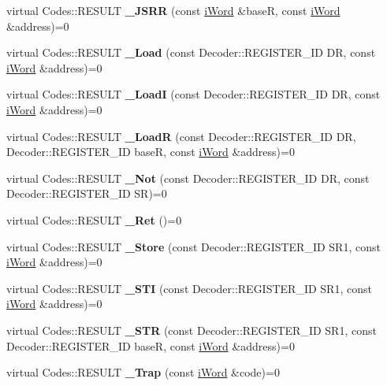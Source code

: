 \begin{DoxyCompactItemize}
\item 
\hypertarget{classiWi11_aeabd561f2728e2345b6a5ae5cdd5b84a}{
virtual Codes::RESULT {\bfseries \_\-JSRR} (const \hyperlink{classiWord}{iWord} \&baseR, const \hyperlink{classiWord}{iWord} \&address)=0}
\label{classiWi11_aeabd561f2728e2345b6a5ae5cdd5b84a}

\item 
\hypertarget{classiWi11_aed1f870b129617436434bb6dcee521ce}{
virtual Codes::RESULT {\bfseries \_\-Load} (const Decoder::REGISTER\_\-ID DR, const \hyperlink{classiWord}{iWord} \&address)=0}
\label{classiWi11_aed1f870b129617436434bb6dcee521ce}

\item 
\hypertarget{classiWi11_ab8f6fc32bfc363f9798c795320c00894}{
virtual Codes::RESULT {\bfseries \_\-LoadI} (const Decoder::REGISTER\_\-ID DR, const \hyperlink{classiWord}{iWord} \&address)=0}
\label{classiWi11_ab8f6fc32bfc363f9798c795320c00894}

\item 
\hypertarget{classiWi11_a47fd64cc3629f9239c75fa4fea753c41}{
virtual Codes::RESULT {\bfseries \_\-LoadR} (const Decoder::REGISTER\_\-ID DR, Decoder::REGISTER\_\-ID baseR, const \hyperlink{classiWord}{iWord} \&address)=0}
\label{classiWi11_a47fd64cc3629f9239c75fa4fea753c41}

\item 
\hypertarget{classiWi11_a942ecd7956af6ad9c65c976b968d7832}{
virtual Codes::RESULT {\bfseries \_\-Not} (const Decoder::REGISTER\_\-ID DR, const Decoder::REGISTER\_\-ID SR)=0}
\label{classiWi11_a942ecd7956af6ad9c65c976b968d7832}

\item 
\hypertarget{classiWi11_ae6c1048642dbf2c03c60062f6aaabfd2}{
virtual Codes::RESULT {\bfseries \_\-Ret} ()=0}
\label{classiWi11_ae6c1048642dbf2c03c60062f6aaabfd2}

\item 
\hypertarget{classiWi11_a52659070aca67bf8fba76f059bc120aa}{
virtual Codes::RESULT {\bfseries \_\-Store} (const Decoder::REGISTER\_\-ID SR1, const \hyperlink{classiWord}{iWord} \&address)=0}
\label{classiWi11_a52659070aca67bf8fba76f059bc120aa}

\item 
\hypertarget{classiWi11_a3a299e4526c8c9865f529cc10e293a0c}{
virtual Codes::RESULT {\bfseries \_\-STI} (const Decoder::REGISTER\_\-ID SR1, const \hyperlink{classiWord}{iWord} \&address)=0}
\label{classiWi11_a3a299e4526c8c9865f529cc10e293a0c}

\item 
\hypertarget{classiWi11_a5002f010e61f0677feb9f8a116504a0c}{
virtual Codes::RESULT {\bfseries \_\-STR} (const Decoder::REGISTER\_\-ID SR1, const Decoder::REGISTER\_\-ID baseR, const \hyperlink{classiWord}{iWord} \&address)=0}
\label{classiWi11_a5002f010e61f0677feb9f8a116504a0c}

\item 
\hypertarget{classiWi11_a74da9304180f3cbece4b7e87e8a53a5d}{
virtual Codes::RESULT {\bfseries \_\-Trap} (const \hyperlink{classiWord}{iWord} \&code)=0}
\label{classiWi11_a74da9304180f3cbece4b7e87e8a53a5d}

\end{DoxyCompactItemize}

